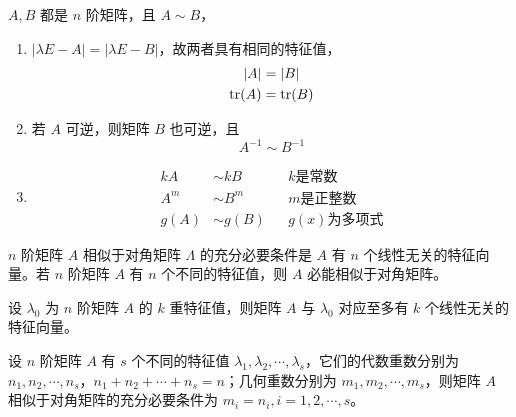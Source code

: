 \documentclass{ctexbook}
\begin{document}
\begin{proposition}[相似矩阵的性质]
    $A,B$ 都是 $n$ 阶矩阵，且 $A\sim B$，
    \begin{enumerate}
        \item $|\lambda E-A|=|\lambda E-B|$，故两者具有相同的特征值，
        \begin{align}
            |A|&=|B|\\
            \textnormal{tr}(A)&=\textnormal{tr}(B)
        \end{align}
        \item 若 $A$ 可逆，则矩阵 $B$ 也可逆，且
        \begin{equation}
            A^{-1}\sim B^{-1}
        \end{equation}
        \item \begin{align}
            kA&\sim kB  && k \text{是常数}\\
            A^m&\sim B^m && m \text{是正整数}\\
            g(A)&\sim g(B) && g(x) \text{为多项式}
        \end{align}
    \end{enumerate}
\end{proposition}

\begin{theorem}[相似对角化条件]
    $n$ 阶矩阵 $A$ 相似于对角矩阵 $\Lambda$ 的充分必要条件是 $A$ 有 $n$ 个线性无关的特征向量。若 $n$ 阶矩阵 $A$ 有 $n$ 个不同的特征值，则 $A$ 必能相似于对角矩阵。
\end{theorem}

\begin{theorem}[代数重数与几何重数]
    设 $\lambda_0$ 为 $n$ 阶矩阵 $A$ 的 $k$ 重特征值，则矩阵 $A$ 与 $\lambda_0$ 对应至多有 $k$ 个线性无关的特征向量。
\end{theorem}

\begin{corollary}[基于重数的相似对角化条件]
    设 $n$ 阶矩阵 $A$ 有 $s$ 个不同的特征值 $\lambda_1,\lambda_2,\cdots,\lambda_s$，它们的代数重数分别为 $n_1,n_2,\cdots,n_s$，$n_1+n_2+\cdots+n_s=n$；几何重数分别为 $m_1,m_2,\cdots,m_s$，则矩阵 $A$ 相似于对角矩阵的充分必要条件为 $m_i=n_i,i=1,2,\cdots,s$。
\end{corollary}
\end{document}
